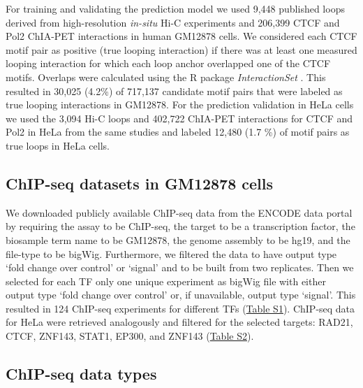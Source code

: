 \documentclass[a4paper,twoside=true,openright,parskip=full,chapterprefix=true,11pt,headings=normal,bibliography=totoc,listof=totoc,titlepage=on,captions=tableabove,draft=false]{scrreprt}
\theoremstyle{definition}
\theoremstyle{definition}
\theoremstyle{definition}
\theoremstyle{remark}
\begin{document}
For training and validating the prediction model we used 9,448 published
loops derived from high-resolution \emph{in-situ} Hi-C experiments
\citep{Rao2014} and 206,399 CTCF and Pol2 ChIA-PET interactions
\citep{Tang2015} in human GM12878 cells. We considered each CTCF motif
pair as positive (true looping interaction) if there was at least one
measured looping interaction for which each loop anchor overlapped one
of the CTCF motifs. Overlaps were calculated using the R package
\emph{InteractionSet} \citep{Lun2016}. This resulted in 30,025 (4.2\%)
of 717,137 candidate motif pairs that were labeled as true looping
interactions in GM12878. For the prediction validation in HeLa cells we
used the 3,094 Hi-C loops and 402,722 ChIA-PET interactions for CTCF and
Pol2 in HeLa from the same studies \citep{Rao2014, Tang2015} and labeled
12,480 (1.7 \%) of motif pairs as true loops in HeLa cells.

\hypertarget{chip-seq-datasets-in-gm12878-cells}{%
\subsection{ChIP-seq datasets in GM12878
cells}\label{chip-seq-datasets-in-gm12878-cells}}

We downloaded publicly available ChIP-seq data from the ENCODE data
portal \citep{Dunham2012, Davis2017} by requiring the assay to be
ChIP-seq, the target to be a transcription factor, the biosample term
name to be GM12878, the genome assembly to be hg19, and the file-type to
be bigWig. Furthermore, we filtered the data to have output type `fold
change over control' or `signal' and to be built from two replicates.
Then we selected for each TF only one unique experiment as bigWig file
with either output type `fold change over control' or, if unavailable,
output type `signal'. This resulted in 124 ChIP-seq experiments for
different TFs (\protect\hyperlink{LoopPredSupTab}{Table S1}). ChIP-seq
data for HeLa were retrieved analogously and filtered for the selected
targets: RAD21, CTCF, ZNF143, STAT1, EP300, and ZNF143
(\protect\hyperlink{LoopPredSupTab}{Table S2}).

\hypertarget{chip-seq-data-types}{%
\subsection{ChIP-seq data types}\label{chip-seq-data-types}}
\end{document}
